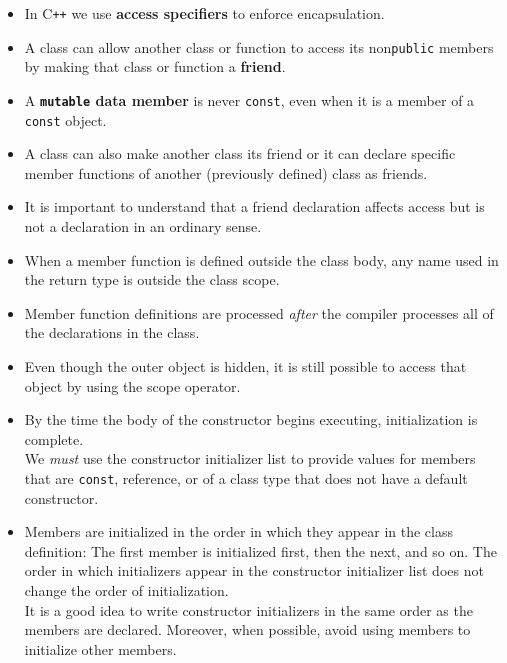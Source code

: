 \begin{itemize}
\item
In C\texttt{++} we use \textbf{access specifiers} to enforce encapsulation.

\item
A class can allow another class or function to access its non\texttt{public} members by making that class or function a \textbf{friend}.

\item
A \textbf{\texttt{mutable} data member} is never \texttt{const}, even when it is a member of a \texttt{const} object.

\item
A class can also make another class its friend or it can declare specific member functions of another (previously defined) class as friends.

\item
It is important to understand that a friend declaration affects access but is not a declaration in an ordinary sense.

\item
When a member function is defined outside the class body, any name used in the return type is outside the class scope.

\item
Member function definitions are processed \textit{after} the compiler processes all of the declarations in the class.

\item
Even though the outer object is hidden, it is still possible to access that object by using the scope operator.

\item
By the time the body of the constructor begins executing, initialization is complete.\\
We \textit{must} use the constructor initializer list to provide values for members that are \texttt{const}, reference, or of a class type that does not have a default constructor.

\item
Members are initialized in the order in which they appear in the class definition: The first member is initialized first, then the next, and so on. The order in which initializers appear in the constructor initializer list does not change the order of initialization.\\
It is a good idea to write constructor initializers in the same order as the members are declared. Moreover, when possible, avoid using members to initialize other members.


\end{itemize}
